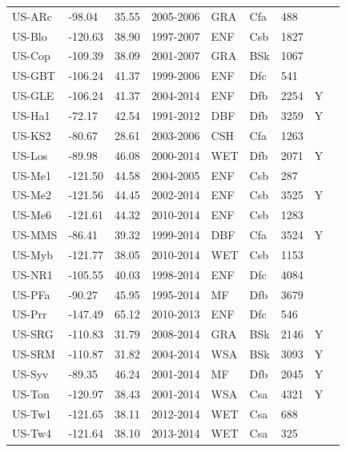\documentclass{myreport}
\begin{document}
\begin{longtable}{lllllllll}
  US-ARc & -98.04 & 35.55 & 2005-2006 & GRA & Cfa & 488 &  & \cite{US-ARc} \\ 
  US-Blo & -120.63 & 38.90 & 1997-2007 & ENF & Csb & 1827 &  & \cite{US-Blo} \\ 
  US-Cop & -109.39 & 38.09 & 2001-2007 & GRA & BSk & 1067 &  & \cite{US-Cop} \\ 
  US-GBT & -106.24 & 41.37 & 1999-2006 & ENF & Dfc & 541 &  & \cite{US-GBT} \\ 
  US-GLE & -106.24 & 41.37 & 2004-2014 & ENF & Dfb & 2254 & Y & \cite{US-GLE} \\ 
  US-Ha1 & -72.17 & 42.54 & 1991-2012 & DBF & Dfb & 3259 & Y & \cite{US-Ha1} \\ 
  US-KS2 & -80.67 & 28.61 & 2003-2006 & CSH & Cfa & 1263 &  & \cite{US-KS2} \\ 
  US-Los & -89.98 & 46.08 & 2000-2014 & WET & Dfb & 2071 & Y & \cite{US-Los} \\ 
  US-Me1 & -121.50 & 44.58 & 2004-2005 & ENF & Csb & 287 &  & \cite{US-Me1} \\ 
  US-Me2 & -121.56 & 44.45 & 2002-2014 & ENF & Csb & 3525 & Y & \cite{US-Me2} \\ 
  US-Me6 & -121.61 & 44.32 & 2010-2014 & ENF & Csb & 1283 &  & \cite{US-Me6} \\ 
  US-MMS & -86.41 & 39.32 & 1999-2014 & DBF & Cfa & 3524 & Y & \cite{US-MMS} \\ 
  US-Myb & -121.77 & 38.05 & 2010-2014 & WET & Csb & 1153 &  & \cite{US-Myb} \\ 
  US-NR1 & -105.55 & 40.03 & 1998-2014 & ENF & Dfc & 4084 &  & \cite{US-NR1} \\ 
  US-PFa & -90.27 & 45.95 & 1995-2014 & MF & Dfb & 3679 &  & \cite{US-PFa} \\ 
  US-Prr & -147.49 & 65.12 & 2010-2013 & ENF & Dfc & 546 &  & \cite{US-Prr} \\ 
  US-SRG & -110.83 & 31.79 & 2008-2014 & GRA & BSk & 2146 & Y & \cite{US-SRG} \\ 
  US-SRM & -110.87 & 31.82 & 2004-2014 & WSA & BSk & 3093 & Y & \cite{US-SRM} \\ 
  US-Syv & -89.35 & 46.24 & 2001-2014 & MF & Dfb & 2045 & Y & \cite{US-Syv} \\ 
  US-Ton & -120.97 & 38.43 & 2001-2014 & WSA & Csa & 4321 & Y & \cite{US-Ton} \\ 
  US-Tw1 & -121.65 & 38.11 & 2012-2014 & WET & Csa & 688 &  & \cite{US-Tw1} \\ 
  US-Tw4 & -121.64 & 38.10 & 2013-2014 & WET & Csa & 325 &  & \cite{US-Tw4} \\ 

\end{longtable}
\end{document}
